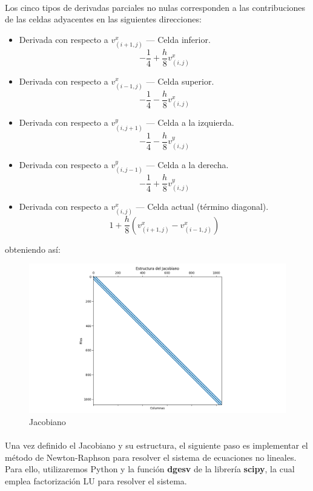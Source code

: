 \documentclass{article}
\begin{document}
  \paragraph{}
  Los cinco tipos de derivadas parciales no nulas corresponden a las contribuciones de las celdas adyacentes en las siguientes direcciones:
  \begin{itemize}
      \item Derivada con respecto a \(v_{(i+1, j)}^x\) — Celda inferior.
      \[-\frac{1}{4}+\frac{h}{8}v_{(i,j)}^x\]
      \item Derivada con respecto a \(v_{(i-1, j)}^x\) — Celda superior.
      \[-\frac{1}{4}-\frac{h}{8}v_{(i,j)}^x\]
      \item Derivada con respecto a \(v_{(i, j+1)}^y\) — Celda a la izquierda.
      \[-\frac{1}{4}-\frac{h}{8}v_{(i,j)}^y\]
      \item Derivada con respecto a \(v_{(i, j-1)}^y\) — Celda a la derecha.
      \[-\frac{1}{4}+\frac{h}{8}v_{(i,j)}^y\]
      \item Derivada con respecto a \(v_{(i, j)}^x\) — Celda actual (término diagonal).
      \[1+\frac{h}{8}(v_{(i+1,j)}^x-v_{(i-1,j)}^x)\]
  \end{itemize}

  obteniendo así:

  \begin{figure}[H]
    \centering
    \includegraphics[width=1\textwidth]{Jacobiano.png}
    \caption{Jacobiano}
  \end{figure}

  \paragraph{}
  Una vez definido el Jacobiano y su estructura, el siguiente paso es implementar el método de Newton-Raphson para resolver el sistema de ecuaciones no lineales. Para ello, utilizaremos Python y la función \textbf{dgesv} de la librería \textbf{scipy}, la cual emplea factorización LU para resolver el sistema.
\end{document}
